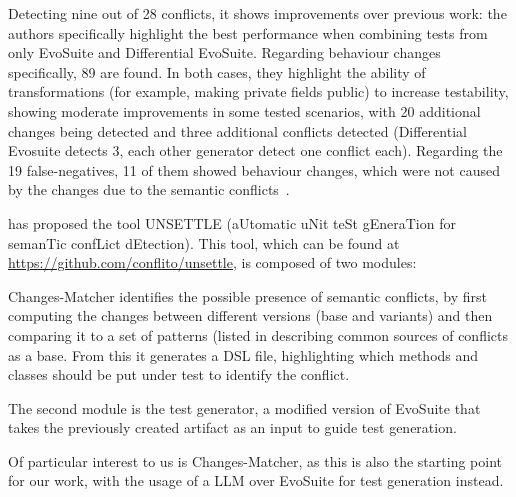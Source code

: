 Detecting nine out of 28 conflicts, it shows improvements over previous work: the authors specifically highlight the best performance when combining tests from only EvoSuite and Differential EvoSuite. Regarding behaviour changes specifically, 89 are found. 
In both cases, they highlight the ability of transformations (for example, making private fields public) to increase testability, showing moderate improvements in some tested scenarios, with 20 additional changes being detected and three additional conflicts detected (Differential Evosuite detects 3, each other generator detect one conflict each).  Regarding the 19 false-negatives, 11 of them showed behaviour changes, which were not caused by the changes due to the semantic conflicts~\cite{kn:leuson2}.


\citet{kn:nuno} has proposed the tool UNSETTLE (aUtomatic uNit teSt gEneraTion for semanTic confLict dEtection). This tool, which can be found at \url{https://github.com/conflito/unsettle}, is composed of two modules:

Changes-Matcher identifies the possible presence of semantic conflicts, by first computing the changes between different versions (base and variants) and then comparing it to a set of patterns (listed in  describing common sources of conflicts as a base. From this it generates a DSL file, highlighting which methods and classes should be put under test to identify the conflict.

The second module is the test generator, a modified version of EvoSuite that takes the previously created artifact as an input to guide test generation.

Of particular interest to us is Changes-Matcher, as this is also the starting point for our work, with the usage of a LLM over EvoSuite for test generation instead.

